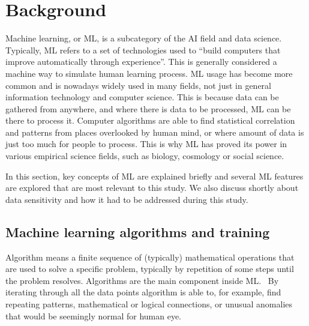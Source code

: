 

\section{Background}\label{sec:background}

Machine learning, or ML,
is a subcategory of the AI field and data science.
Typically, ML refers to
a set of technologies used to \enquote{build computers
that improve automatically through experience}.\cite{jordan2015machine}
This is generally considered a machine way
to simulate human learning process.
ML usage has become more common
and is nowadays widely used in many fields,
not just in general information technology and computer science.
This is because data can be gathered from anywhere,
and where there is data to be processed,
ML can be there to process it.
Computer algorithms are able to find 
statistical correlation and patterns
from places overlooked by human mind,
or where amount of data is just too much 
for people to process.
This is why ML has proved its power
in various empirical science fields,
such as biology, cosmology or social science.\cite{jordan2015machine}

In this section, 
key concepts of ML are explained briefly
and several ML features are explored 
that are most relevant to this study.
We also discuss shortly about data sensitivity
and how it had to be addressed during this study.



\subsection{Machine learning algorithms and training}\label{subsec:bg-machine-learning}

Algorithm means a finite sequence of (typically) mathematical operations
that are used to solve a specific problem,
typically by repetition of some steps
until the problem resolves.\cite{merriam2022algorithm}
Algorithms are the main component inside ML.~
By iterating through all the data points
algorithm is able to, for example,
find repeating patterns,
mathematical or logical connections,
or unusual anomalies that would be seemingly normal for human eye.

